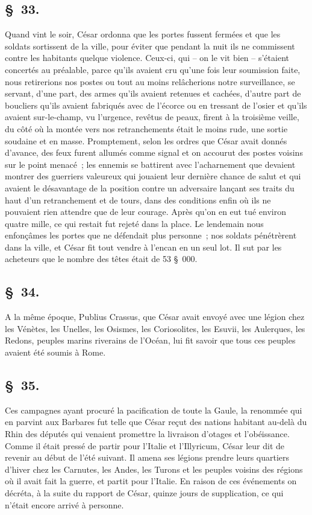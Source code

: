 \documentclass[french,twoside]{book} %
\begin{document}
\subsection[{§ 33.}]{ \textsc{§ 33.} }
\noindent Quand vint le soir, César ordonna que les portes fussent fermées et que les soldats sortissent de la ville, pour éviter que pendant la nuit ils ne commissent contre les habitants quelque violence. Ceux-ci, qui – on le vit bien – s’étaient concertés au préalable, parce qu’ils avaient cru qu’une fois leur soumission faite, nous retirerions nos postes ou tout au moins relâcherions notre surveillance, se servant, d’une part, des armes qu’ils avaient retenues et cachées, d’autre part de boucliers qu’ils avaient fabriqués avec de l’écorce ou en tressant de l’osier et qu’ils avaient sur-le-champ, vu l’urgence, revêtus de peaux, firent à la troisième veille, du côté où la montée vers nos retranchements était le moins rude, une sortie soudaine et en masse. Promptement, selon les ordres que César avait donnés d’avance, des feux furent allumés comme signal et on accourut des postes voisins sur le point menacé ; les ennemis se battirent avec l’acharnement que devaient montrer des guerriers valeureux qui jouaient leur dernière chance de salut et qui avaient le désavantage de la position contre un adversaire lançant ses traits du haut d’un retranchement et de tours, dans des conditions enfin où ils ne pouvaient rien attendre que de leur courage. Après qu’on en eut tué environ quatre mille, ce qui restait fut rejeté dans la place. Le lendemain nous enfonçâmes les portes que ne défendait plus personne ; nos soldats pénétrèrent dans la ville, et César fit tout vendre à l’encan en un seul lot. Il sut par les acheteurs que le nombre des têtes était de 53 § 000.
\subsection[{§ 34.}]{ \textsc{§ 34.} }
\noindent A la même époque, Publius Crassus, que César avait envoyé avec une légion chez les Vénètes, les Unelles, les Osismes, les Coriosolites, les Esuvii, les Aulerques, les Redons, peuples marins riverains de l’Océan, lui fit savoir que tous ces peuples avaient été soumis à Rome.
\subsection[{§ 35.}]{ \textsc{§ 35.} }
\noindent Ces campagnes ayant procuré la pacification de toute la Gaule, la renommée qui en parvint aux Barbares fut telle que César reçut des nations habitant au-delà du Rhin des députés qui venaient promettre la livraison d’otages et l’obéissance. Comme il était pressé de partir pour l’Italie et l’Illyricum, César leur dit de revenir au début de l’été suivant. Il amena ses légions prendre leurs quartiers d’hiver chez les Carnutes, les Andes, les Turons et les peuples voisins des régions où il avait fait la guerre, et partit pour l’Italie. En raison de ces événements on décréta, à la suite du rapport de César, quinze jours de supplication, ce qui n’était encore arrivé à personne.
\end{document}
